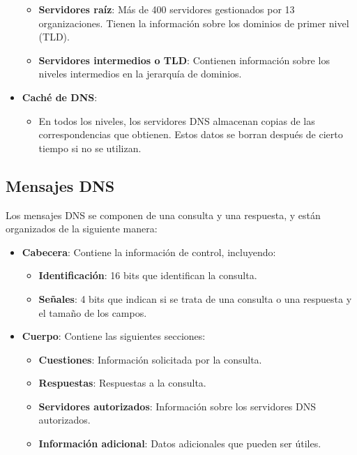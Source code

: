 \documentclass{article}
\begin{document}
\begin{itemize}
\begin{itemize}
        \item \textbf{Servidores raíz}: Más de 400 servidores gestionados por 13 organizaciones. Tienen la información sobre los dominios de primer nivel (TLD).
        \item \textbf{Servidores intermedios o TLD}: Contienen información sobre los niveles intermedios en la jerarquía de dominios.
    \end{itemize}
    \item \textbf{Caché de DNS}:
    \begin{itemize}
        \item En todos los niveles, los servidores DNS almacenan copias de las correspondencias que obtienen. Estos datos se borran después de cierto tiempo si no se utilizan.
    \end{itemize}
\end{itemize}

\subsection{Mensajes DNS}

Los mensajes DNS se componen de una consulta y una respuesta, y están organizados de la siguiente manera:

\begin{itemize}
    \item \textbf{Cabecera}: Contiene la información de control, incluyendo:
    \begin{itemize}
        \item \textbf{Identificación}: 16 bits que identifican la consulta.
        \item \textbf{Señales}: 4 bits que indican si se trata de una consulta o una respuesta y el tamaño de los campos.
    \end{itemize}
    \item \textbf{Cuerpo}: Contiene las siguientes secciones:
    \begin{itemize}
        \item \textbf{Cuestiones}: Información solicitada por la consulta.
        \item \textbf{Respuestas}: Respuestas a la consulta.
        \item \textbf{Servidores autorizados}: Información sobre los servidores DNS autorizados.
        \item \textbf{Información adicional}: Datos adicionales que pueden ser útiles.
    \end{itemize}
\end{itemize}
\end{document}
